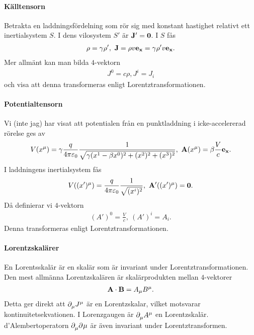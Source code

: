 \paragraph{Källtensorn}
Betrakta en laddningsfördelning som rör sig med konstant hastighet relativt ett inertialsystem $S$. I dens vilosystem $S'$ är $\vb{J}' = \vb{0}$. I $S$ fås
\begin{align*}
	\rho = \gamma \rho',\ \vb{J} = \rho v\vb{e}_{\vb{x}} = \gamma\rho' v\vb{e}_{\vb{x}}.
\end{align*}
Mer allmänt kan man bilda $4$-vektorn
\begin{align*}
	J^{0} = c\rho, J^{i} = J_{i}
\end{align*}
och visa att denna transformeras enligt Lorentztransformationen.

\paragraph{Potentialtensorn}
Vi (inte jag) har visat att potentialen från en punktladdning i icke-accelererad rörelse ges av
\begin{align*}
	V(x^{\mu}) = \gamma\frac{q}{4\pi\varepsilon_{0}}\frac{1}{\sqrt{\gamma(x^{1} - \beta x^{0})^{2} + (x^{2})^{2} + (x^{3})^{2}}},\ \vb{A}(x^{\mu}) = \beta\frac{V}{c}\vb{e}_{\vb{x}}.
\end{align*}
I laddningens inertialsystem fås
\begin{align*}
	V((x')^{\mu}) = \frac{q}{4\pi\varepsilon_{0}}\frac{1}{\sqrt{(x^{i})^{2}}},\ \vb{A}'((x')^{\mu}) = \vb{0}.
\end{align*}
Då definierar vi $4$-vektorn
\begin{align*}
	(A')^{0} = \frac{V}{c},\ (A')^{i} = A_{i}.
\end{align*}
Denna transformeras enligt Lorentztransformationen.

\paragraph{Lorentzskalärer}
En Lorentsskalär är en skalär som är invariant under Lorentztransformationen. Den mest allmänna Lorentzskalären är skalärprodukten mellan $4$-vektorer
\begin{align*}
	\vb{A}\cdot\vb{B} = A_{\mu}B^{\mu}.
\end{align*}
Detta ger direkt att $\partial_{\mu}^{}J^{\mu}$ är en Lorentzskalar, vilket motsvarar kontinuitetsekvationen. I Lorenzgaugen är $\partial_{\mu}^{}A^{\mu}$ en Lorentzskalär. d'Alembertoperatorn $\partial_{\mu}^{}\partial^{}\mu{}$ är även invariant under Lorentztransformen.

